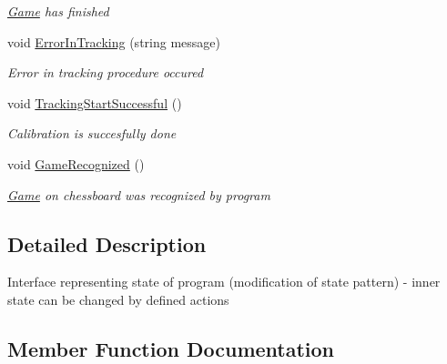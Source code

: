 \begin{DoxyCompactItemize}
\begin{DoxyCompactList}\small\item\em \mbox{\hyperlink{namespace_chess_tracking_1_1_game}{Game}} has finished \end{DoxyCompactList}\item 
void \mbox{\hyperlink{interface_chess_tracking_1_1_controlling_elements_1_1_program_state_1_1_i_program_state_aefc4990cd4c48560aa7d6b857476bd56}{Error\+In\+Tracking}} (string message)
\begin{DoxyCompactList}\small\item\em Error in tracking procedure occured \end{DoxyCompactList}\item 
void \mbox{\hyperlink{interface_chess_tracking_1_1_controlling_elements_1_1_program_state_1_1_i_program_state_ae544420adecf8b0f6a58863cb3f89b1a}{Tracking\+Start\+Successful}} ()
\begin{DoxyCompactList}\small\item\em Calibration is succesfully done \end{DoxyCompactList}\item 
void \mbox{\hyperlink{interface_chess_tracking_1_1_controlling_elements_1_1_program_state_1_1_i_program_state_a4b28776980cafc1555ae100548aaf046}{Game\+Recognized}} ()
\begin{DoxyCompactList}\small\item\em \mbox{\hyperlink{namespace_chess_tracking_1_1_game}{Game}} on chessboard was recognized by program \end{DoxyCompactList}\end{DoxyCompactItemize}


\subsection{Detailed Description}
Interface representing state of program (modification of state pattern) -\/ inner state can be changed by defined actions 



\subsection{Member Function Documentation}
\mbox{\label{interface_chess_tracking_1_1_controlling_elements_1_1_program_state_1_1_i_program_state_aefc4990cd4c48560aa7d6b857476bd56}} 

